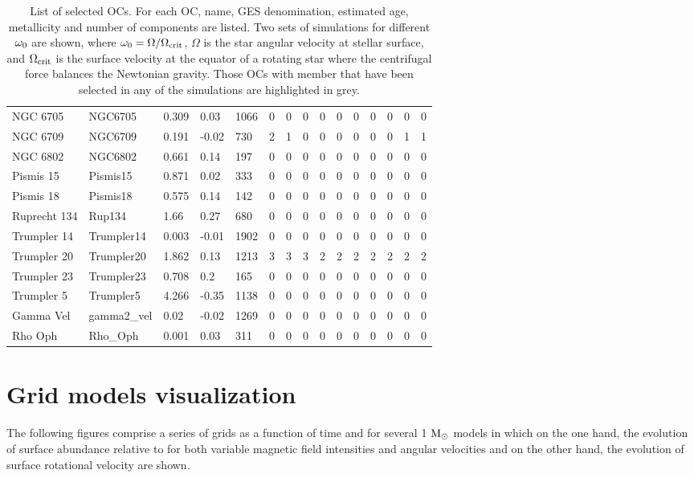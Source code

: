 \documentclass[fleqn,usenatbib]{mnras}
\begin{document}
\begin{table}
\begin{tabular}{|l l l l l || c c c c c | c c c c c|}
            NGC 6705 & NGC6705 & 0.309 & 0.03 & 1066 & 0 & 0 & 0 & 0 & 0 & 0 & 0 & 0 & 0 & 0\\
            \rowcolor{lightgray}
            NGC 6709 & NGC6709 & 0.191 & -0.02 & 730 & 2 & 1 & 0 & 0 & 0 & 0 & 0 & 0 & 1 & 1\\
            NGC 6802 & NGC6802 & 0.661 & 0.14 & 197 & 0 & 0 & 0 & 0 & 0 & 0 & 0 & 0 & 0 & 0\\
            Pismis 15 & Pismis15 & 0.871 & 0.02 & 333 & 0 & 0 & 0 & 0 & 0 & 0 & 0 & 0 & 0 & 0\\
            Pismis 18 & Pismis18 & 0.575 & 0.14 & 142 & 0 & 0 & 0 & 0 & 0 & 0 & 0 & 0 & 0 & 0\\
            Ruprecht 134 & Rup134 & 1.66 & 0.27 & 680 & 0 & 0 & 0 & 0 & 0 & 0 & 0 & 0 & 0 & 0\\
            Trumpler 14 & Trumpler14 & 0.003 & -0.01 & 1902 & 0 & 0 & 0 & 0 & 0 & 0 & 0 & 0 & 0 & 0\\
            \rowcolor{lightgray}
            Trumpler 20 & Trumpler20 & 1.862 & 0.13 & 1213 & 3 & 3 & 3 & 2 & 2 & 2 & 2 & 2 & 2 & 2\\
            Trumpler 23 & Trumpler23 & 0.708 & 0.2 & 165 & 0 & 0 & 0 & 0 & 0 & 0 & 0 & 0 & 0 & 0\\
            Trumpler 5 & Trumpler5 & 4.266 & -0.35 & 1138 & 0 & 0 & 0 & 0 & 0 & 0 & 0 & 0 & 0 & 0\\
            Gamma Vel & gamma2\_vel & 0.02 & -0.02 & 1269 & 0 & 0 & 0 & 0 & 0 & 0 & 0 & 0 & 0 & 0\\
            Rho Oph & Rho\_Oph & 0.001 & 0.03 & 311 & 0 & 0 & 0 & 0 & 0 & 0 & 0 & 0 & 0 & 0\\           
            \hline
	\end{tabular}
 	\caption{List of selected OCs. For each OC, name, GES denomination, estimated age, metallicity and number of components are listed. Two sets of simulations for different $\omega_{\mathrm{0}}$ are shown, where $\omega_{\mathrm{0}} = \Omega / \Omega_{\mathrm{crit}}$, $\Omega$ is the star angular velocity at stellar surface, and $\Omega_{\mathrm{crit}}$ is the surface velocity at the equator of a rotating star where the centrifugal force balances the Newtonian gravity. Those OCs with member that have been selected in any of the simulations are highlighted in grey.}
  	\label{tab:oc_full_list}
\end{table}


\clearpage
\section{Grid models visualization}
The following figures comprise a series of grids as a function of time and for several 1 $\mathrm{M}_\odot$ models in which on the one hand, the evolution of surface  abundance relative to  for both variable magnetic field intensities and angular velocities and on the other hand, the evolution of surface rotational velocity are shown.
\end{document}
